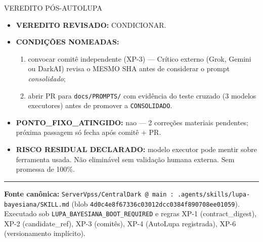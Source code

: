 \documentclass[11pt,a4paper]{article}
\begin{document}
\begin{bloco}{VEREDITO PÓS-AUTOLUPA}
\begin{itemize}[leftmargin=1.4em]
  \item \textbf{VEREDITO REVISADO:} CONDICIONAR.
  \item \textbf{CONDIÇÕES NOMEADAS:}
    \begin{enumerate}
      \item convocar comitê independente (XP-3) --- Crítico
        externo (Grok, Gemini ou DarkAI) revisa o MESMO SHA
        antes de considerar o prompt \emph{consolidado};
      \item abrir PR para \texttt{docs/PROMPTS/} com
        evidência do teste cruzado (3 modelos executores)
        antes de promover a \texttt{CONSOLIDADO}.
    \end{enumerate}
  \item \textbf{PONTO\_FIXO\_ATINGIDO:} nao --- 2 correções
        materiais pendentes; próxima passagem só fecha após
        comitê + PR.
  \item \textbf{RISCO RESIDUAL DECLARADO:} modelo executor pode
        mentir sobre ferramenta usada. Não eliminável sem
        validação humana externa. Sem promessa de 100\%.
\end{itemize}
\end{bloco}

\vspace{1em}
\hrule
\vspace{0.5em}
\small
\textbf{Fonte canônica:} \texttt{ServerVpss/CentralDark @ main :
.agents/skills/lupa-bayesiana/SKILL.md} (blob
\texttt{4d0c4e8f67336c03012dcc0384f890708ee01059}). Executado
sob \texttt{LUPA\_BAYESIANA\_BOOT\_REQUIRED} e regras XP-1
(contract\_digest), XP-2 (candidate\_ref), XP-3 (comitês),
XP-4 (AutoLupa registrada), XP-6 (versionamento implícito).
\end{document}
